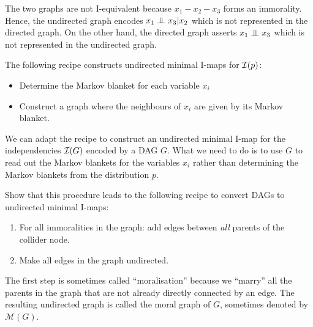 \begin{exenumerate}
  \begin{solution}
    The two graphs are not I-equivalent because $x_1-x_2-x_3$ forms an
    immorality. Hence, the undirected graph encodes $x_1 \mathrel{\perp\mspace{-10mu}\perp}
    x_3 | x_2$ which is not represented in the directed graph. On the
    other hand, the directed graph asserts $x_1 \mathrel{\perp\mspace{-10mu}\perp} x_3$
    which is not represented in the undirected graph.
  \end{solution}

\end{exenumerate}

\label{ex:DAG-to-undirected}
The following recipe constructs undirected minimal I-maps for
$\mathcal{I}(p)$:
\begin{itemize}
\item Determine the Markov blanket for each variable $x_i$
\item Construct a graph where the neighbours of $x_i$ are given by its
  Markov blanket.
\end{itemize}
We can adapt the recipe to construct an undirected minimal I-map for
the independencies $\mathcal{I}(G)$ encoded by a DAG $G$. What we need to do
is to use $G$ to read out the Markov blankets for the variables $x_i$
rather than determining the Markov blankets from the distribution $p$.

Show that this procedure leads to the following recipe to
convert DAGs to undirected minimal I-maps:
\begin{enumerate}
\item For all immoralities in the graph: add edges between \emph{all} parents of the collider node.
\item Make all edges in the graph undirected.
\end{enumerate}
The first step is sometimes called ``moralisation'' because we
``marry'' all the parents in the graph that are not already directly
connected by an edge. The resulting undirected graph is called the
moral graph of $G$, sometimes denoted by $\mathcal{M}(G)$.


